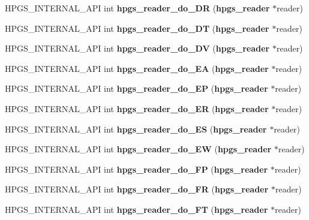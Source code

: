 \begin{CompactItemize}
\item 
HPGS\_\-INTERNAL\_\-API int \textbf{hpgs\_\-reader\_\-do\_\-DR} ({\bf hpgs\_\-reader} $\ast$reader)\label{group__reader_g6fde6f8a776473acf6683ced91415743}

\item 
HPGS\_\-INTERNAL\_\-API int \textbf{hpgs\_\-reader\_\-do\_\-DT} ({\bf hpgs\_\-reader} $\ast$reader)\label{group__reader_g53fd0eac606f85f5a523f3b0e8eca709}

\item 
HPGS\_\-INTERNAL\_\-API int \textbf{hpgs\_\-reader\_\-do\_\-DV} ({\bf hpgs\_\-reader} $\ast$reader)\label{group__reader_g67a3da5778ba2345bcd7850ee1f3cf9c}

\item 
HPGS\_\-INTERNAL\_\-API int \textbf{hpgs\_\-reader\_\-do\_\-EA} ({\bf hpgs\_\-reader} $\ast$reader)\label{group__reader_g56f851fe681986c554fd9d7ecc922b46}

\item 
HPGS\_\-INTERNAL\_\-API int \textbf{hpgs\_\-reader\_\-do\_\-EP} ({\bf hpgs\_\-reader} $\ast$reader)\label{group__reader_g0bb9c47666480d821eee966fe07f8dee}

\item 
HPGS\_\-INTERNAL\_\-API int \textbf{hpgs\_\-reader\_\-do\_\-ER} ({\bf hpgs\_\-reader} $\ast$reader)\label{group__reader_ga828610be5d48b3e772dfc7b271c45c8}

\item 
HPGS\_\-INTERNAL\_\-API int \textbf{hpgs\_\-reader\_\-do\_\-ES} ({\bf hpgs\_\-reader} $\ast$reader)\label{group__reader_gfed23058d33ebc96a782b855eb4f92e4}

\item 
HPGS\_\-INTERNAL\_\-API int \textbf{hpgs\_\-reader\_\-do\_\-EW} ({\bf hpgs\_\-reader} $\ast$reader)\label{group__reader_ge28138f75961e023bcfd78e64fc5ceee}

\item 
HPGS\_\-INTERNAL\_\-API int \textbf{hpgs\_\-reader\_\-do\_\-FP} ({\bf hpgs\_\-reader} $\ast$reader)\label{group__reader_g12b7528135c3ec735ade1c16de31fc07}

\item 
HPGS\_\-INTERNAL\_\-API int \textbf{hpgs\_\-reader\_\-do\_\-FR} ({\bf hpgs\_\-reader} $\ast$reader)\label{group__reader_gb9a653b9eb8e015b7ebcb70f90a05910}

\item 
HPGS\_\-INTERNAL\_\-API int \textbf{hpgs\_\-reader\_\-do\_\-FT} ({\bf hpgs\_\-reader} $\ast$reader)\label{group__reader_ga708b9b01fd1206552a0d29d2e0577a7}


\end{CompactItemize}
